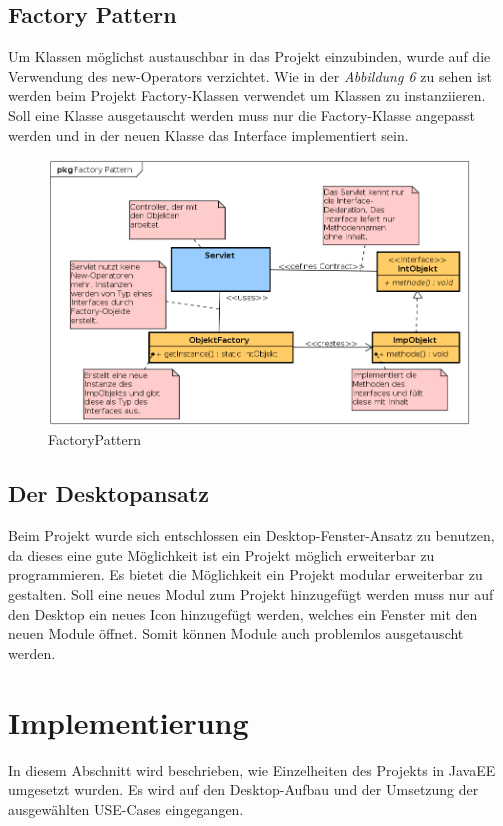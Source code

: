 \documentclass[12pt, a4paper]{article}
\begin{document}
\subsection{Factory Pattern}
Um Klassen möglichst austauschbar in das Projekt einzubinden, wurde auf die Verwendung des \glqq new-Operators\grqq{} verzichtet. Wie in der \textit{Abbildung 6} zu sehen ist werden beim Projekt \glqq Factory-Klassen\grqq{} verwendet um Klassen zu instanziieren. Soll eine Klasse ausgetauscht werden muss nur die Factory-Klasse angepasst werden und in der neuen Klasse das Interface implementiert sein.

\begin{figure}[H]
	\begin{center}
		\includegraphics[width=120mm]{Bilder/FactoryPattern.png}
	\end{center}
	\caption{FactoryPattern}
\end{figure}


\subsection{Der Desktopansatz}
Beim Projekt wurde sich entschlossen ein Desktop-Fenster-Ansatz zu benutzen, da dieses eine gute Möglichkeit ist ein Projekt möglich erweiterbar zu programmieren. Es bietet die Möglichkeit ein Projekt modular erweiterbar zu gestalten. Soll eine neues Modul zum Projekt hinzugefügt werden muss nur auf den Desktop ein neues Icon hinzugefügt werden, welches ein Fenster mit den neuen Module öffnet. Somit können Module auch problemlos ausgetauscht werden.


\section{Implementierung}
In diesem Abschnitt wird beschrieben, wie Einzelheiten des Projekts in JavaEE umgesetzt wurden. Es wird auf den Desktop-Aufbau und der Umsetzung der ausgewählten USE-Cases eingegangen.
\end{document}
